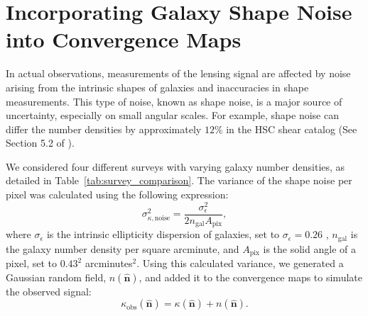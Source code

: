\section{Incorporating Galaxy Shape Noise into Convergence Maps}
In actual observations, measurements of the lensing signal are affected by noise arising from the intrinsic shapes of galaxies and inaccuracies in shape measurements. This type of noise, known as shape noise, is a major source of uncertainty, especially on small angular scales. For example, shape noise can differ the number densities by approximately $12 \%$ in the HSC shear catalog (See Section 5.2 of \citealt{2018PASJ...70S..25M}). 

We considered four different surveys with varying galaxy number densities, as detailed in Table~\ref{tab:survey_comparison}. The variance of the shape noise per pixel was calculated using the following expression:
\begin{equation}
    \sigma_{\kappa, \text{noise}}^2 = \frac{\sigma_{\epsilon}^2}{2 n_{\mathrm{gal}} A_{\mathrm{pix}}},
\end{equation}
where $\sigma_{\epsilon}$ is the intrinsic ellipticity dispersion of galaxies, set to $\sigma_{\epsilon} = 0.26$ \citep{2019A&A...627A..59E}, $n_{\mathrm{gal}}$ is the galaxy number density per square arcminute, and $A_{\mathrm{pix}}$ is the solid angle of a pixel, set to $0.43^2$ arcminutes$^2$. Using this calculated variance, we generated a Gaussian random field, $n(\hat{\mathbf{n}})$, and added it to the convergence maps to simulate the observed signal:
\begin{equation}
    \kappa_{\mathrm{obs}}(\hat{\mathbf{n}}) = \kappa(\hat{\mathbf{n}}) + n(\hat{\mathbf{n}}).
\end{equation}

